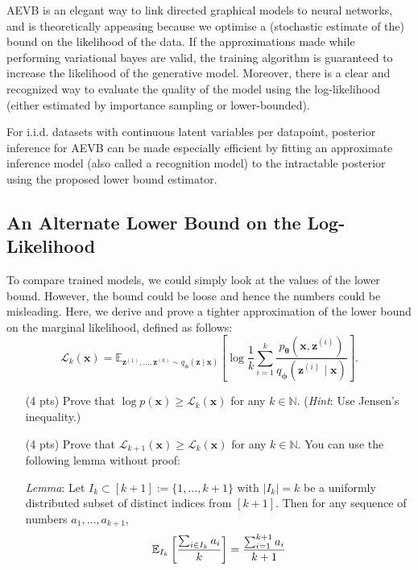AEVB is an elegant way to link directed graphical models to neural networks, and is theoretically appeasing because we optimise a (stochastic estimate of the) bound on the likelihood of the data. If the approximations made while performing variational bayes are valid, the training algorithm is guaranteed to increase the likelihood of the generative model. Moreover, there is a clear and recognized way to evaluate the quality of the model using the log-likelihood (either estimated by importance sampling or lower-bounded).

For i.i.d. datasets with continuous latent variables per datapoint, posterior inference for AEVB can be made especially efficient by fitting an approximate inference model (also called a recognition model) to the intractable posterior using the proposed lower bound estimator.


\subsection{An Alternate Lower Bound on the Log-Likelihood}\label{section:1-alternate-lower-bound}

To compare trained models, we could simply look at the values of the lower bound. However, the bound could be loose and hence the numbers could be misleading. Here, we derive and prove a tighter approximation of the lower bound on the marginal likelihood, defined as follows:
    \begin{equation}\label{eq:alternate-lower-bound}
        \mathcal{L}_k(\mathbf{x}) = \mathbb{E}_{\mathbf{z}^{(1)}, \dots, \mathbf{z}^{(k)} \sim q_{\mathbf{\phi}}(\mathbf{z} \mid \mathbf{x})} \left[ \log \frac{1}{k} \sum_{i=1}^k \frac{p_{\mathbf{\theta}}(\mathbf{x}, \mathbf{z}^{(i)})}{q_{\mathbf{\phi}}(\mathbf{z}^{(i)} \mid \mathbf{x})} \right].
    \end{equation}

\begin{itemize}
    \item[(4 pts)] Prove that $\log p(\mathbf{x}) \geq \mathcal{L}_{k}(\mathbf{x})$ for any $k \in \mathbb{N}$. (\emph{Hint}: Use Jensen's inequality.)
    
\begin{solution}
\end{solution}

    \item[(4 pts)] Prove that $\mathcal{L}_{k+1}(\mathbf{x}) \geq \mathcal{L}_{k}(\mathbf{x})$ for any $k \in \mathbb{N}$. You can use the following lemma without proof:
    
    \emph{Lemma}: Let $I_k \subset [k+1] := \{1, \ldots, k+1\}$ with $|I_k| = k$ be a uniformly distributed subset of distinct indices from $[k+1]$. Then for any sequence of numbers $a_1, \ldots, a_{k+1}$,
    \begin{equation}\label{eq:new-bound-lemma}
    \mathbb{E}_{I_k} \left[ \sum_{i \in I_k} a_i \over k \right] 
    = { \sum_{i=1}^{k+1} a_i \over k+1}
    \end{equation}

\begin{solution}
\end{solution}
\end{itemize}

